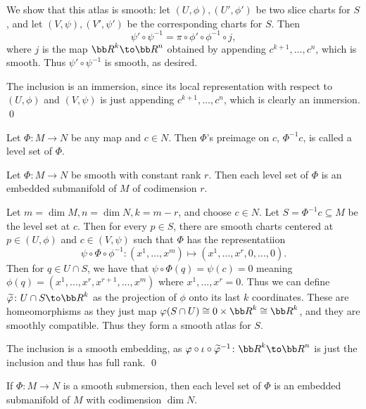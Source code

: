     We show that this atlas is smooth: let $(U,\phi),(U',\phi')$ be two slice charts for $S$, and let $(V,\psi),(V',\psi')$
    be the corresponding charts for $S$.
    Then
    $$ \psi'\circ\psi^{-1} = \pi\circ\phi'\circ\phi^{-1}\circ j, $$
    where $j$ is the map $\bR^k\to\bR^n$ obtained by appending $c^{k+1},\dots,c^n$, which is smooth.
    Thus $\psi'\circ\psi^{-1}$ is smooth, as desired.

    The inclusion is an immersion, since its local representation with respect to $(U,\phi)$ and $(V,\psi)$ is
    just appending $c^{k+1},\dots,c^n$, which is clearly an immersion.
    \qed

\eproof

\bdefn

    Let $\Phi\colon M\to N$ be any map and $c\in N$.
    Then $\Phi$'s preimage on $c$, $\Phi^{-1}c$, is called a {\emphcolor level set} of $\Phi$.

\edefn

\bprop

    Let $\Phi\colon M\to N$ be smooth with constant rank $r$.
    Then each level set of $\Phi$ is an embedded submanifold of $M$ of codimension $r$.

\eprop

\bproof

    Let $m=\dim M,n=\dim N,k=m-r$, and choose $c\in N$.
    Let $S=\Phi^{-1}c\subseteq M$ be the level set at $c$.
    Then for every $p\in S$, there are smooth charts centered at $p\in (U,\phi)$ and $c\in(V,\psi)$ such that $\Phi$ has the representatiion
    $$ \psi\circ\Phi\circ\phi^{-1}\colon (x^1,\dots,x^m) \mapsto (x^1,\dots,x^r,0,\dots,0) . $$
    Then for $q\in U\cap S$, we have that $\psi\circ\Phi(q)=\psi(c)=0$ meaning $\phi(q)=(x^1,\dots,x^r,x^{r+1},\dots,x^m)$ where $x^1,\dots,x^r=0$.
    Thus we can define $\tilde\phi\colon U\cap S\to\bR^k$ as the projection of $\phi$ onto its last $k$ coordinates.
    These are homeomorphisms as they just map $\phi(S\cap U)\cong 0\times\bR^k\cong\bR^k$, and they are smoothly compatible.
    Thus they form a smooth atlas for $S$.

    The inclusion is a smooth embedding, as $\phi\circ\iota\circ\tilde\phi^{-1}\colon\bR^k\to\bR^n$ is just the inclusion and thus has full rank.
    \qed

\eproof

\bcoro

    If $\Phi\colon M\to N$ is a smooth submersion, then each level set of $\Phi$ is an embedded submanifold of $M$ with codimension $\dim N$.

